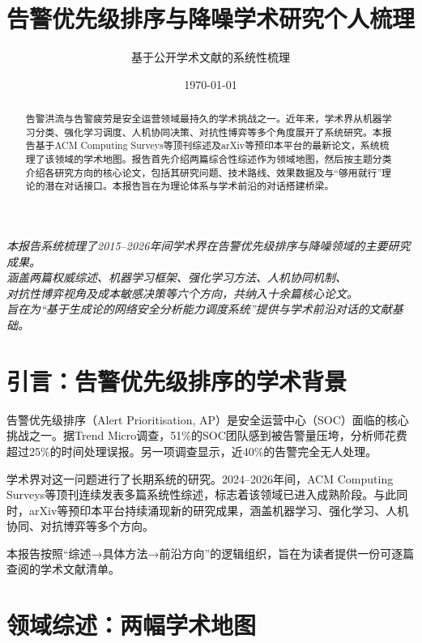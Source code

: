 \documentclass[11pt,a4paper]{article}
\title{告警优先级排序与降噪学术研究个人梳理}
\author{基于公开学术文献的系统性梳理}
\date{\today}
\begin{document}
\maketitle

\begin{center}
\textit{
本报告系统梳理了2015--2026年间学术界在告警优先级排序与降噪领域的主要研究成果。\\
涵盖两篇权威综述、机器学习框架、强化学习方法、人机协同机制、\\
对抗性博弈视角及成本敏感决策等六个方向，共纳入十余篇核心论文。\\
旨在为“基于生成论的网络安全分析能力调度系统”提供与学术前沿对话的文献基础。
}
\end{center}

\vspace{5mm}

\begin{abstract}
告警洪流与告警疲劳是安全运营领域最持久的学术挑战之一。近年来，学术界从机器学习分类、强化学习调度、人机协同决策、对抗性博弈等多个角度展开了系统研究。本报告基于ACM Computing Surveys等顶刊综述及arXiv等预印本平台的最新论文，系统梳理了该领域的学术地图。报告首先介绍两篇综合性综述作为领域地图，然后按主题分类介绍各研究方向的核心论文，包括其研究问题、技术路线、效果数据及与“够用就行”理论的潜在对话接口。本报告旨在为理论体系与学术前沿的对话搭建桥梁。
\end{abstract}

\tableofcontents

\section{引言：告警优先级排序的学术背景}

告警优先级排序（Alert Prioritisation, AP）是安全运营中心（SOC）面临的核心挑战之一。据Trend Micro调查，51\%的SOC团队感到被告警量压垮，分析师花费超过25\%的时间处理误报。另一项调查显示，近40\%的告警完全无人处理。

学术界对这一问题进行了长期系统的研究。2024--2026年间，ACM Computing Surveys等顶刊连续发表多篇系统性综述，标志着该领域已进入成熟阶段。与此同时，arXiv等预印本平台持续涌现新的研究成果，涵盖机器学习、强化学习、人机协同、对抗博弈等多个方向。

本报告按照“综述→具体方法→前沿方向”的逻辑组织，旨在为读者提供一份可逐篇查阅的学术文献清单。

\section{领域综述：两幅学术地图}
\end{document}
